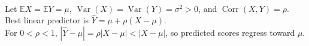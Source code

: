 \begin{example} \label{ex:regression-to-the-mean-linear-prediction} \\
Let $\mathbb{E}X=\mathbb{E}Y=\mu$, $\operatorname{Var}(X)=\operatorname{Var}(Y)=\sigma^2>0$, and $\operatorname{Corr}(X,Y)=\rho$. Best linear predictor is $\widehat{Y}=\mu+\rho(X-\mu)$.\\
For $0<\rho<1$, $|\widehat{Y}-\mu|=\rho|X-\mu|<|X-\mu|$, so predicted scores regress toward $\mu$.
\end{example}
